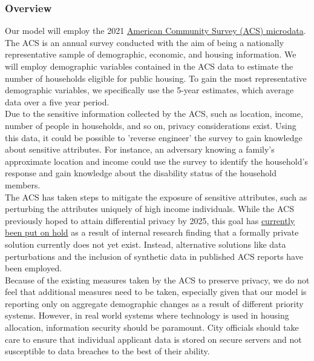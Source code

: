 \documentclass[11pt]{article}
\begin{document}
\subsubsection{Overview}Our model will employ the 2021 \href{https://data.census.gov/mdat/#/search?ds=ACSPUMS5Y2021}{American Community Survey (ACS) microdata}. The ACS is an annual survey conducted with the aim of being a nationally representative sample of demographic, economic, and housing information. We will employ demographic variables contained in the ACS data to estimate the number of households eligible for public housing. To gain the most representative demographic variables, we specifically use the 5-year estimates, which average data over a five year period. \\
\newline
Due to the sensitive information collected by the ACS, such as location, income, number of people in households, and so on, privacy considerations exist. Using this data, it could be possible to 'reverse engineer' the survey to gain knowledge about sensitive attributes. For instance, an adversary knowing a family's approximate location and income could use the survey to identify the household's response and gain knowledge about the disability status of the household members. \\
\newline
The ACS has taken steps to mitigate the exposure of sensitive attributes, such as perturbing the attributes uniquely of high income individuals. While the ACS previously hoped to attain differential privacy by 2025, this goal has \href{https://www.census.gov/newsroom/blogs/random-samplings/2022/12/disclosure-avoidance-protections-acs.html}{currently been put on hold} as a result of internal research finding that a formally private solution currently does not yet exist. Instead, alternative solutions like data perturbations and the inclusion of synthetic data in published ACS reports have been employed. \\
\newline
Because of the existing measures taken by the ACS to preserve privacy, we do not feel that additional measures need to be taken, especially given that our model is reporting only on aggregate demographic changes as a result of different priority systems. However, in real world systems where technology is used in housing allocation, information security should be paramount. City officials should take care to ensure that individual applicant data is stored on secure servers and not susceptible to data breaches to the best of their ability. 
\end{document}
